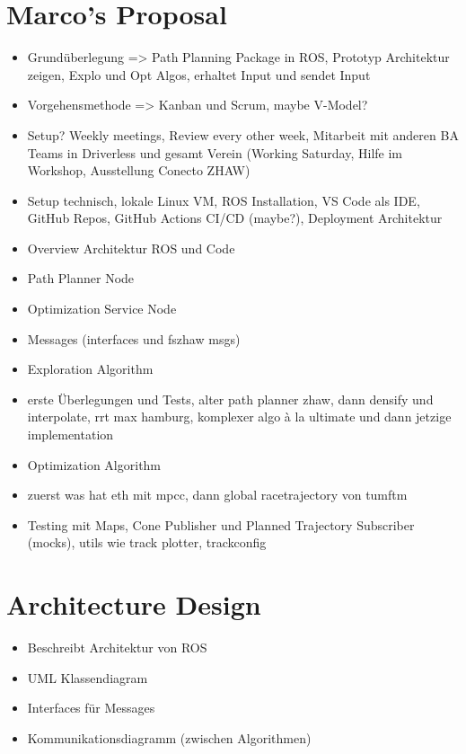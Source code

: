 \section{Marco's Proposal}
\begin{itemize}
    \item Grundüberlegung => Path Planning Package in ROS, Prototyp Architektur zeigen, Explo und Opt Algos, erhaltet Input und sendet Input
    \item Vorgehensmethode => Kanban und Scrum, maybe V-Model?
    \item Setup? Weekly meetings, Review every other week, Mitarbeit mit anderen BA Teams in Driverless und gesamt Verein (Working Saturday, Hilfe im Workshop, Ausstellung Conecto ZHAW)
    \item Setup technisch, lokale Linux VM, ROS Installation, VS Code als IDE, GitHub Repos, GitHub Actions CI/CD (maybe?), Deployment Architektur
    \item Overview Architektur ROS und Code
    \item Path Planner Node
    \item Optimization Service Node
    \item Messages (interfaces und fszhaw msgs)
    \item Exploration Algorithm
    \item erste Überlegungen und Tests, alter path planner zhaw, dann densify und interpolate, rrt max hamburg, komplexer algo à la ultimate und dann jetzige implementation
    \item Optimization Algorithm
    \item zuerst was hat eth mit mpcc, dann global racetrajectory von tumftm
    \item Testing mit Maps, Cone Publisher und Planned Trajectory Subscriber (mocks), utils wie track plotter, trackconfig
\end{itemize}

\section{Architecture Design} \label{sec:Architecture Design}
\begin{itemize}
    \item Beschreibt Architektur von ROS
    \item UML Klassendiagram
    \item Interfaces für Messages
    \item Kommunikationsdiagramm (zwischen Algorithmen)
\end{itemize}

